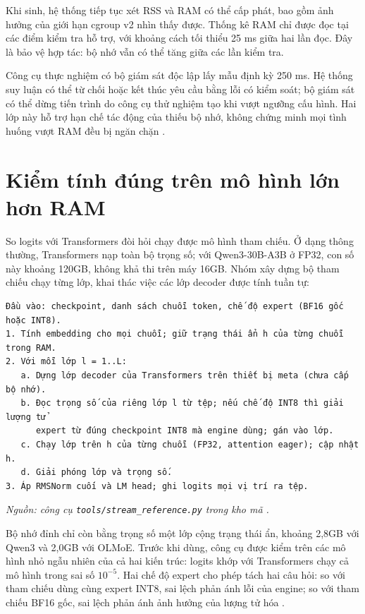 Khi sinh, hệ thống tiếp tục xét RSS và RAM có thể cấp phát, bao gồm ảnh hưởng của giới hạn cgroup v2 nhìn thấy được. Thống kê RAM chỉ được đọc tại các điểm kiểm tra hỗ trợ, với khoảng cách tối thiểu 25 ms giữa hai lần đọc. Đây là bảo vệ hợp tác: bộ nhớ vẫn có thể tăng giữa các lần kiểm tra.

Công cụ thực nghiệm có bộ giám sát độc lập lấy mẫu định kỳ 250 ms. Hệ thống suy luận có thể từ chối hoặc kết thúc yêu cầu bằng lỗi có kiểm soát; bộ giám sát có thể dừng tiến trình do công cụ thử nghiệm tạo khi vượt ngưỡng cấu hình. Hai lớp này hỗ trợ hạn chế tác động của thiếu bộ nhớ, không chứng minh mọi tình huống vượt RAM đều bị ngăn chặn \cite{exp_ram_guard_i5}.

\section{Kiểm tính đúng trên mô hình lớn hơn RAM}

So logits với Transformers đòi hỏi chạy được mô hình tham chiếu. Ở dạng thông thường, Transformers nạp toàn bộ trọng số; với Qwen3-30B-A3B ở FP32, con số này khoảng 120GB, không khả thi trên máy 16GB. Nhóm xây dựng bộ tham chiếu chạy từng lớp, khai thác việc các lớp decoder được tính tuần tự:

\begin{Verbatim}[samepage=true,breaklines=true,breakanywhere=true,fontsize=\small,frame=single,framesep=3mm]
Đầu vào: checkpoint, danh sách chuỗi token, chế độ expert (BF16 gốc hoặc INT8).
1. Tính embedding cho mọi chuỗi; giữ trạng thái ẩn h của từng chuỗi trong RAM.
2. Với mỗi lớp l = 1..L:
   a. Dựng lớp decoder của Transformers trên thiết bị meta (chưa cấp bộ nhớ).
   b. Đọc trọng số của riêng lớp l từ tệp; nếu chế độ INT8 thì giải lượng tử
      expert từ đúng checkpoint INT8 mà engine dùng; gán vào lớp.
   c. Chạy lớp trên h của từng chuỗi (FP32, attention eager); cập nhật h.
   d. Giải phóng lớp và trọng số.
3. Áp RMSNorm cuối và LM head; ghi logits mọi vị trí ra tệp.
\end{Verbatim}

\textit{Nguồn: công cụ \texttt{tools/stream\_reference.py} trong kho mã \cite{moe_tierengine_arch}.}

Bộ nhớ đỉnh chỉ còn bằng trọng số một lớp cộng trạng thái ẩn, khoảng 2,8GB với Qwen3 và 2,0GB với OLMoE. Trước khi dùng, công cụ được kiểm trên các mô hình nhỏ ngẫu nhiên của cả hai kiến trúc: logits khớp với Transformers chạy cả mô hình trong sai số $10^{-5}$. Hai chế độ expert cho phép tách hai câu hỏi: so với tham chiếu dùng cùng expert INT8, sai lệch phản ánh lỗi của engine; so với tham chiếu BF16 gốc, sai lệch phản ánh ảnh hưởng của lượng tử hóa \cite{exp_parity}.

